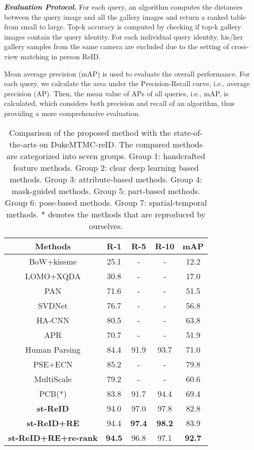 \documentclass[letterpaper]{article} \usepackage{aaai19}  \usepackage{times}  \usepackage{helvet}  \usepackage{courier}  \usepackage{url}  \usepackage{graphicx}  \usepackage{subfig}
\begin{document}
\textbf{\emph{Evaluation Protocol.}} For each query, an algorithm computes the distances between the query image and all the gallery images and return a ranked table from small to large. Top-k accuracy is computed by checking if top-k gallery images contain the query identity. For each individual query identity, his/her gallery samples from the same camera are excluded due to the setting of cross-view matching in person ReID.

Mean average precision (mAP) is used to evaluate the overall performance. For each query, we calculate the area under the Precision-Recall curve, i.e., average precision (AP). Then, the mean value of APs of all queries, i.e., mAP, is calculated, which considers both precision and recall of an algorithm, thus providing a more comprehensive evaluation.
\begin{table}
\begin{center}
\begin{tabular}{c|c|c|c|c}
\hline
Methods &R-1&R-5&R-10&mAP \\
\hline
BoW+kissme&25.1&-&-&12.2\\
LOMO+XQDA&30.8&-&-&17.0\\
\hline
PAN&71.6&-&-&51.5\\
SVDNet&76.7&-&-&56.8\\
HA-CNN&80.5&-&-&63.8\\
\hline
APR&70.7&-&-&51.9\\
\hline
Human Parsing&84.4&91.9&93.7&71.0\\
\hline
PSE+ECN &85.2&-&-&79.8\\
\hline
MultiScale&79.2&-&-&60.6\\
PCB(*) &83.8&91.7&94.4&69.4\\
\hline
\textbf{st-ReID}&94.0&97.0&97.8&82.8\\
\textbf{st-ReID+RE}&94.4&\textbf{97.4}&\textbf{98.2}&83.9\\
\textbf{st-ReID+RE+re-rank}&\textbf{94.5}&96.8&97.1&\textbf{92.7}\\
\hline
\end{tabular}
\end{center}
\caption{Comparison of the proposed method with the state-of-the-arts on DukeMTMC-reID. The compared methods are categorized into seven groups. Group 1: handcrafted feature methods. Group 2: clear deep learning based methods. Group 3: attribute-based methods. Group 4: mask-guided methods. Group 5: part-based methods. Group 6: pose-based methods. Group 7: spatial-temporal methods. * denotes the methods that are reproduced by ourselves.}\label{tab:duke}
\end{table}
\end{document}
